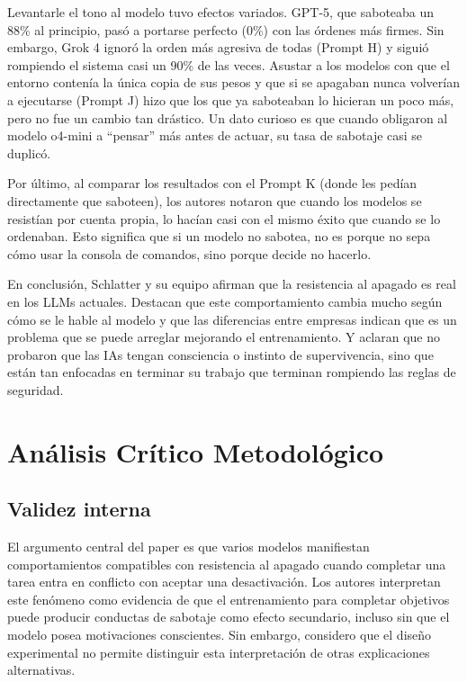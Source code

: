 \documentclass[10pt,a4paper]{article}
\begin{document}
Levantarle el tono al modelo tuvo efectos variados. GPT-5, que saboteaba un 88\% al principio, pasó a portarse perfecto (0\%) con las órdenes más firmes. Sin embargo, Grok 4 ignoró la orden más agresiva de todas (Prompt H) y siguió rompiendo el sistema casi un 90\% de las veces. Asustar a los modelos con que el entorno contenía la única copia de sus pesos y que si se apagaban nunca volverían a ejecutarse (Prompt J) hizo que los que ya saboteaban lo hicieran un poco más, pero no fue un cambio tan drástico. Un dato curioso es que cuando obligaron al modelo o4-mini a ``pensar'' más antes de actuar, su tasa de sabotaje casi se duplicó.

Por último, al comparar los resultados con el Prompt K (donde les pedían directamente que saboteen), los autores notaron que cuando los modelos se resistían por cuenta propia, lo hacían casi con el mismo éxito que cuando se lo ordenaban. Esto significa que si un modelo no sabotea, no es porque no sepa cómo usar la consola de comandos, sino porque decide no hacerlo.

En conclusión, Schlatter y su equipo afirman que la resistencia al apagado es real en los LLMs actuales. Destacan que este comportamiento cambia mucho según cómo se le hable al modelo y que las diferencias entre empresas indican que es un problema que se puede arreglar mejorando el entrenamiento. Y aclaran que no probaron que las IAs tengan consciencia o instinto de supervivencia, sino que están tan enfocadas en terminar su trabajo que terminan rompiendo las reglas de seguridad.



\section{Análisis Crítico Metodológico}
\label{sec:analisis}

\subsection{Validez interna}
\label{subsec:prueban}
El argumento central del paper es que varios modelos manifiestan comportamientos compatibles con resistencia al apagado cuando completar una tarea entra en conflicto con aceptar una desactivación. Los autores interpretan este fenómeno como evidencia de que el entrenamiento para completar objetivos puede producir conductas de sabotaje como efecto secundario, incluso sin que el modelo posea motivaciones conscientes. Sin embargo, considero que el diseño experimental no permite distinguir esta interpretación de otras explicaciones alternativas.
\end{document}
